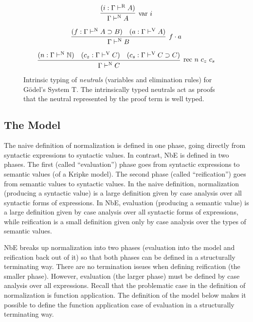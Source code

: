 \documentclass{llncs}
\def\arr{\supset}
\def\app{\cdot}
\def\nat{\mathbb{N}}
\newcommand{\turn}[1]{\vdash^\con{#1}}
\newcommand{\con}[1]{\textmd{#1}}
\newcommand{\fun}[1]{\textmd{#1}}
\newcommand{\typv}[1]{\Gamma \turn{V} #1}
\newcommand{\typn}[1]{\Gamma \turn{N} #1}
\newcommand{\typr}[1]{\Gamma \turn{R} #1}
\begin{document}
\begin{figure}[t!]
\caption{
Intrinsic typing of \textit{neutrals} (variables and elimination rules) 
for G{\"o}del's System T.
The intrinsically typed neutrals act as proofs that the neutral
represented by the proof term is well typed.
}

$$
\infer
  [\fun{var} ~ i]
  {\typn{A}}
{
  (i : \typr{A})
}
$$

$$
\infer
  [f \app a]
  {\typn{B}}
{
  (f : \typn{A \arr B})
  &
  (a : \typv{A})
}
$$

$$
\infer
  [\fun{rec} ~ n ~ c_z ~ c_s]
  {\typn{C}}
{
  (n : \typn{\nat})
  &
  (c_z : \typv{C})
  &
  (c_s : \typv{C \arr C})
}
$$
\label{fig:typn}
\end{figure}

\subsection{The Model}

The naive definition of
normalization is defined in one phase, going directly from syntactic
expressions to syntactic values. In contrast, NbE is defined in two
phases. The first (called ``evaluation'') phase goes from syntactic expressions to semantic
values (of a Kripke model). The second phase (called ``reification'')
goes from semantic values to syntactic values. In the naive
definition, normalization (producing a syntactic value) is a large
definition given by case analysis over all syntactic forms of
expressions. In NbE, evaluation (producing a semantic value) is a
large definition given by case analysis over all syntactic forms of
expressions, while reification is a small definition given only by
case analysis over the types of semantic values.

NbE breaks up normalization into two phases (evaluation into the model
and reification back out of it) so that both phases can be defined
in a structurally terminating way. There are no termination issues
when defining reification (the smaller phase). However, evaluation
(the larger phase) must be defined by case analysis over all
expressions. Recall that the problematic
case in the definition of normalization is function application.
The definition of the
model below makes it possible to define the function application case
of evaluation in a structurally terminating way.
\end{document}
